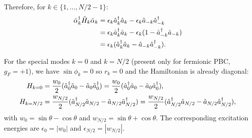 \documentclass[aps,prx,twocolumn,superscriptaddress,nofootinbib,nolongbibliography,nobalancelastpage,10pt,floatfix]{revtex4-2}
\begin{document}
Therefore, for $k \in \{1, \ldots, N/2-1\}$:
\begin{align}
    \tilde{\alpha}_k^\dag \tilde{H}_k \tilde{\alpha}_k &= \epsilon_k \hat{a}_k^\dag \hat{a}_k - \epsilon_k \hat{a}_{-k} \hat{a}_{-k}^\dag\\
                             &= \epsilon_k \hat{a}_k^\dag \hat{a}_k - \epsilon_k (1 - \hat{a}_{-k}^\dag \hat{a}_{-k})\\
                             &= \epsilon_k (\hat{a}_k^\dag \hat{a}_k - \hat{a}_{-k}\hat{a}_{-k}^\dag).
\end{align}

For the special modes $k=0$ and $k=N/2$ (present only for fermionic PBC, $g_F=+1$), we have $\sin\phi_k=0$ so $r_k=0$ and the Hamiltonian is already diagonal:
\begin{align}
    H_{k=0}
     &= \frac{w_0}{2}(\tilde{a}_0^\dag \tilde{a}_0 - \tilde{a}_0 \tilde{a}_0^\dag)
      = \frac{w_0}{2}(\hat{a}_0^\dag \hat{a}_0 - \hat{a}_0 \hat{a}_0^\dag),\\
    H_{k=N/2}
     &= \frac{w_{N/2}}{2}(\tilde{a}_{N/2}^\dag \tilde{a}_{N/2} - \tilde{a}_{N/2} \tilde{a}_{N/2}^\dag)
      = \frac{w_{N/2}}{2}(\hat{a}_{N/2}^\dag \hat{a}_{N/2} - \hat{a}_{N/2} \hat{a}_{N/2}^\dag),
\end{align}
with $w_0=\sin\theta-\cos\theta$ and $w_{N/2}=\sin\theta+\cos\theta$. The corresponding excitation energies are $\epsilon_0=|w_0|$ and $\epsilon_{N/2}=|w_{N/2}|$.
\end{document}
